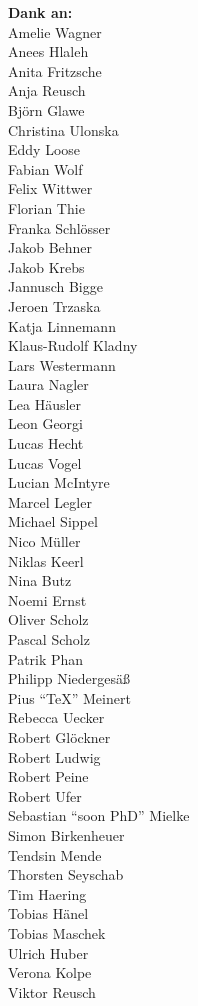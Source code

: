 \begin{minipage}[t][\textheight][b]{.25\textwidth}
\footnotesize
\raggedleft
\textbf{Dank an:}\\[1\baselineskip]
Amelie Wagner\\
Anees Hlaleh\\
Anita Fritzsche\\
Anja Reusch\\
Björn Glawe\\
Christina Ulonska\\
Eddy Loose\\
Fabian Wolf\\
Felix Wittwer\\
Florian Thie\\
Franka Schlösser\\
Jakob Behner\\
Jakob Krebs\\
Jannusch Bigge\\
Jeroen Trzaska\\
Katja Linnemann\\
Klaus-Rudolf Kladny\\
Lars Westermann\\
Laura Nagler\\
Lea Häusler\\
Leon Georgi\\
Lucas Hecht\\
Lucas Vogel\\
Lucian McIntyre\\
Marcel Legler\\
Michael Sippel\\
Nico Müller\\
Niklas Keerl\\
Nina Butz\\
Noemi Ernst\\
Oliver Scholz\\
Pascal Scholz\\
Patrik Phan\\
Philipp Niedergesäß\\
Pius \foreignlanguage{english}{\enquote{\TeX}} Meinert\\
Rebecca Uecker\\
Robert Glöckner\\
Robert Ludwig\\
Robert Peine\\
Robert Ufer\\
Sebastian \foreignlanguage{english}{\enquote{soon PhD}} Mielke\\
Simon Birkenheuer\\
Tendsin Mende\\
Thorsten Seyschab\\
Tim Haering\\
Tobias Hänel\\
Tobias Maschek\\
Ulrich Huber\\
Verona Kolpe\\
Viktor Reusch
\end{minipage}

